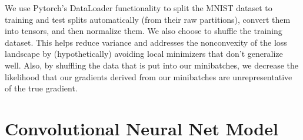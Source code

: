 \documentclass[11pt]{article}
\begin{document}
    We use Pytorch's DataLoader functionality to split the MNIST dataset to
training and test splits automatically (from their raw partitions),
convert them into tensors, and then normalize them. We also choose to
shuffle the training dataset. This helps reduce variance and addresses
the nonconvexity of the loss landscape by (hypothetically) avoiding
local minimizers that don't generalize well. Also, by shuffling the data
that is put into our minibatches, we decrease the likelihood that our
gradients derived from our minibatches are unrepresentative of the true
gradient.

    \hypertarget{convolutional-neural-net-model}{%
\section{Convolutional Neural Net
Model}\label{convolutional-neural-net-model}}
\end{document}
